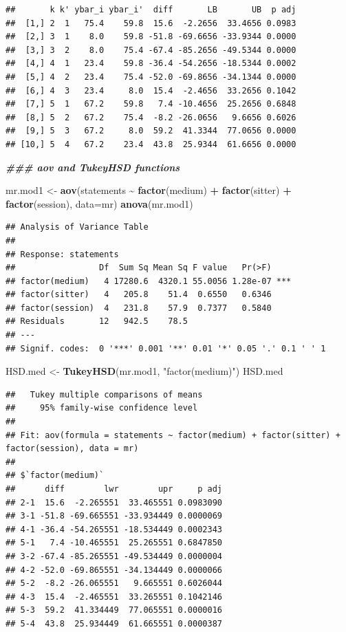 \documentclass[
]{book}
\newenvironment{Shaded}{\begin{snugshade}}{\end{snugshade}}
\newcommand{\AttributeTok}[1]{\textcolor[rgb]{0.13,0.29,0.53}{#1}}
\newcommand{\DocumentationTok}[1]{\textcolor[rgb]{0.56,0.35,0.01}{\textbf{\textit{#1}}}}
\newcommand{\FunctionTok}[1]{\textcolor[rgb]{0.13,0.29,0.53}{\textbf{#1}}}
\newcommand{\NormalTok}[1]{#1}
\newcommand{\OtherTok}[1]{\textcolor[rgb]{0.56,0.35,0.01}{#1}}
\newcommand{\SpecialCharTok}[1]{\textcolor[rgb]{0.81,0.36,0.00}{\textbf{#1}}}
\newcommand{\StringTok}[1]{\textcolor[rgb]{0.31,0.60,0.02}{#1}}
\begin{document}
\begin{verbatim}
##       k k' ybar_i ybar_i'  diff       LB       UB  p adj
##  [1,] 2  1   75.4    59.8  15.6  -2.2656  33.4656 0.0983
##  [2,] 3  1    8.0    59.8 -51.8 -69.6656 -33.9344 0.0000
##  [3,] 3  2    8.0    75.4 -67.4 -85.2656 -49.5344 0.0000
##  [4,] 4  1   23.4    59.8 -36.4 -54.2656 -18.5344 0.0002
##  [5,] 4  2   23.4    75.4 -52.0 -69.8656 -34.1344 0.0000
##  [6,] 4  3   23.4     8.0  15.4  -2.4656  33.2656 0.1042
##  [7,] 5  1   67.2    59.8   7.4 -10.4656  25.2656 0.6848
##  [8,] 5  2   67.2    75.4  -8.2 -26.0656   9.6656 0.6026
##  [9,] 5  3   67.2     8.0  59.2  41.3344  77.0656 0.0000
## [10,] 5  4   67.2    23.4  43.8  25.9344  61.6656 0.0000
\end{verbatim}

\begin{Shaded}
\begin{Highlighting}[]
\DocumentationTok{\#\#\# aov and TukeyHSD functions}

\NormalTok{mr.mod1 }\OtherTok{\textless{}{-}} \FunctionTok{aov}\NormalTok{(statements }\SpecialCharTok{\textasciitilde{}} \FunctionTok{factor}\NormalTok{(medium) }\SpecialCharTok{+} \FunctionTok{factor}\NormalTok{(sitter) }\SpecialCharTok{+} \FunctionTok{factor}\NormalTok{(session), }\AttributeTok{data=}\NormalTok{mr)}
\FunctionTok{anova}\NormalTok{(mr.mod1)}
\end{Highlighting}
\end{Shaded}

\begin{verbatim}
## Analysis of Variance Table
## 
## Response: statements
##                 Df  Sum Sq Mean Sq F value   Pr(>F)    
## factor(medium)   4 17280.6  4320.1 55.0056 1.28e-07 ***
## factor(sitter)   4   205.8    51.4  0.6550   0.6346    
## factor(session)  4   231.8    57.9  0.7377   0.5840    
## Residuals       12   942.5    78.5                     
## ---
## Signif. codes:  0 '***' 0.001 '**' 0.01 '*' 0.05 '.' 0.1 ' ' 1
\end{verbatim}

\begin{Shaded}
\begin{Highlighting}[]
\NormalTok{HSD.med }\OtherTok{\textless{}{-}} \FunctionTok{TukeyHSD}\NormalTok{(mr.mod1, }\StringTok{"factor(medium)"}\NormalTok{)}
\NormalTok{HSD.med}
\end{Highlighting}
\end{Shaded}

\begin{verbatim}
##   Tukey multiple comparisons of means
##     95% family-wise confidence level
## 
## Fit: aov(formula = statements ~ factor(medium) + factor(sitter) + factor(session), data = mr)
## 
## $`factor(medium)`
##      diff        lwr        upr     p adj
## 2-1  15.6  -2.265551  33.465551 0.0983090
## 3-1 -51.8 -69.665551 -33.934449 0.0000069
## 4-1 -36.4 -54.265551 -18.534449 0.0002343
## 5-1   7.4 -10.465551  25.265551 0.6847850
## 3-2 -67.4 -85.265551 -49.534449 0.0000004
## 4-2 -52.0 -69.865551 -34.134449 0.0000066
## 5-2  -8.2 -26.065551   9.665551 0.6026044
## 4-3  15.4  -2.465551  33.265551 0.1042146
## 5-3  59.2  41.334449  77.065551 0.0000016
## 5-4  43.8  25.934449  61.665551 0.0000387
\end{verbatim}
\end{document}
